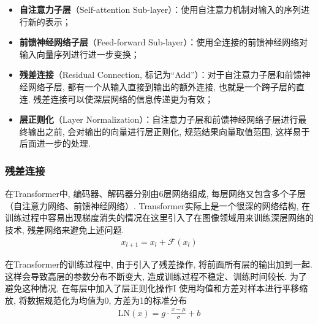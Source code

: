 \documentclass[a4paper]{article}
\theoremstyle{definition}
\numberwithin{equation}{section}
\begin{document}
    \begin{itemize}
        \vspace{0.5em}
        \item {\small\sffamily\bfseries{自注意力子层}}（Self-attention Sub-layer）：使用自注意力机制对输入的序列进行新的表示；
        \vspace{0.5em}
        \item {\small\sffamily\bfseries{前馈神经网络子层}}（Feed-forward Sub-layer）：使用全连接的前馈神经网络对输入向量序列进行进一步变换；
        \vspace{0.5em}
        \item {\small\sffamily\bfseries{残差连接}}（Residual Connection, 标记为``Add''）：对于自注意力子层和前馈神经网络子层, 都有一个从输入直接到输出的额外连接, 也就是一个跨子层的直连. 残差连接可以使深层网络的信息传递更为有效；
        \vspace{0.5em}
        \item {\small\sffamily\bfseries{层正则化}}（Layer Normalization）：自注意力子层和前馈神经网络子层进行最终输出之前, 会对输出的向量进行层正则化, 规范结果向量取值范围, 这样易于后面进一步的处理. 
        \vspace{0.5em}
        \end{itemize}

\subsubsection{残差连接}
在Transformer中, 编码器、解码器分别由6层网络组成, 每层网络又包含多个子层（自注意力网络、前馈神经网络）. Transformer实际上是一个很深的网络结构, 在训练过程中容易出现梯度消失的情况在这里引入了在图像领域用来训练深层网络的技术, 残差网络来避免上述问题.
\begin{eqnarray}
    x_{l+1} = x_l + \mathcal{F} (x_l)
    \end{eqnarray}

    在Transformer的训练过程中, 由于引入了残差操作, 将前面所有层的输出加到一起. 这样会导致高层的参数分布不断变大, 造成训练过程不稳定、训练时间较长. 为了避免这种情况, 在每层中加入了层正则化操作I 使用均值和方差对样本进行平移缩放, 将数据规范化为均值为0, 方差为1的标准分布
    \begin{eqnarray}
        \textrm{LN}(x) = g \cdot \frac{x- \mu} {\sigma} + b
        \end{eqnarray}  
\end{document}
